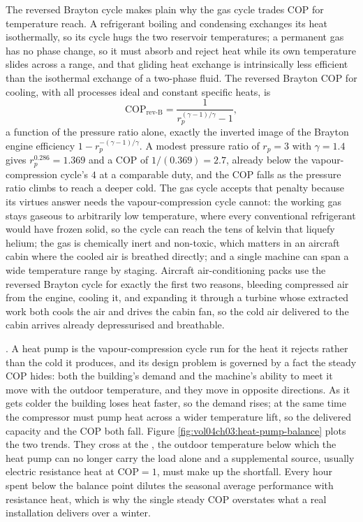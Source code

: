 The reversed Brayton cycle makes plain why the gas cycle trades COP for
temperature reach. A refrigerant boiling and condensing exchanges its heat
isothermally, so its cycle hugs the two reservoir temperatures; a permanent gas
has no phase change, so it must absorb and reject heat while its own temperature
slides across a range, and that gliding heat exchange is intrinsically less
efficient than the isothermal exchange of a two-phase fluid. The reversed Brayton
COP for cooling, with all processes ideal and constant specific heats, is
\[
\text{COP}_{\text{rev-B}} = \frac{1}{r_p^{(\gamma-1)/\gamma} - 1},
\]
a function of the pressure ratio alone, exactly the inverted image of the Brayton
engine efficiency $1 - r_p^{-(\gamma-1)/\gamma}$. A modest pressure ratio of
$r_p = 3$ with $\gamma = 1.4$ gives $r_p^{0.286} = 1.369$ and a COP of
$1/(0.369) = 2.7$, already below the vapour-compression cycle's $4$ at a
comparable duty, and the COP falls as the pressure ratio climbs to reach a deeper
cold. The gas cycle accepts that penalty because its virtues answer needs the
vapour-compression cycle cannot: the working gas stays gaseous to arbitrarily low
temperature, where every conventional refrigerant would have frozen solid, so the
cycle can reach the tens of kelvin that liquefy helium; the gas is chemically
inert and non-toxic, which matters in an aircraft cabin where the cooled air is
breathed directly; and a single machine can span a wide temperature range by
staging. Aircraft air-conditioning packs use the reversed Brayton cycle for
exactly the first two reasons, bleeding compressed air from the engine, cooling
it, and expanding it through a turbine whose extracted work both cools the air and
drives the cabin fan, so the cold air delivered to the cabin arrives already
depressurised and breathable.

. A heat pump is the
vapour-compression cycle run for the heat it rejects rather than the cold
it produces, and its design problem is governed by a fact the steady
COP hides: both the building's demand and the machine's ability to meet
it move with the outdoor temperature, and they move in opposite
directions. As it gets colder the building loses heat faster, so the
demand rises; at the same time the compressor must pump heat across a
wider temperature lift, so the delivered capacity and the COP both fall.
Figure \ref{fig:vol04ch03:heat-pump-balance} plots the two trends. They
cross at the , the outdoor temperature below which
the heat pump can no longer carry the load alone and a supplemental
source, usually electric resistance heat at $\text{COP}=1$, must make up
the shortfall. Every hour spent below the balance point dilutes the
seasonal average performance with resistance heat, which is why the
single steady COP overstates what a real installation delivers over a
winter.

